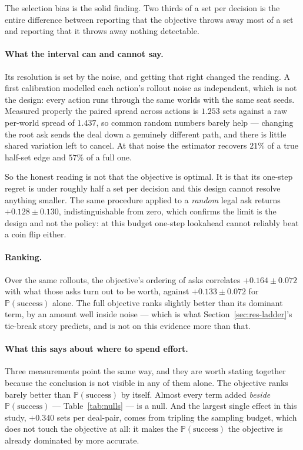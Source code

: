 \documentclass[11pt,a4paper]{article}
\newcommand{\Prob}{\ensuremath{\mathbb{P}}}
\begin{document}
The selection bias is the solid finding. Two thirds of a set per decision is the
entire difference between reporting that the objective throws away most of a set
and reporting that it throws away nothing detectable.

\paragraph{What the interval can and cannot say.} Its resolution is set by the
noise, and getting that right changed the reading. A first calibration modelled
each action's rollout noise as independent, which is not the design: every
action runs through the same worlds with the same seat seeds. Measured properly
the paired spread across actions is $1.253$ sets against a raw per-world spread
of $1.437$, so common random numbers barely help --- changing the root ask sends
the deal down a genuinely different path, and there is little shared variation
left to cancel. At that noise the estimator recovers $21\%$ of a true half-set
edge and $57\%$ of a full one.

So the honest reading is not that the objective is optimal. It is that its
one-step regret is under roughly half a set per decision and this design cannot
resolve anything smaller. The same procedure applied to a \emph{random} legal ask
returns $+0.128 \pm 0.130$, indistinguishable from zero, which confirms the limit
is the design and not the policy: at this budget one-step lookahead cannot
reliably beat a coin flip either.

\paragraph{Ranking.} Over the same rollouts, the objective's ordering of asks
correlates $+0.164 \pm 0.072$ with what those asks turn out to be worth, against
$+0.133 \pm 0.072$ for $\Prob(\text{success})$ alone. The full objective ranks
slightly better than its dominant term, by an amount well inside noise --- which
is what Section~\ref{sec:res-ladder}'s tie-break story predicts, and is not on
this evidence more than that.

\paragraph{What this says about where to spend effort.} Three measurements point
the same way, and they are worth stating together because the conclusion is not
visible in any of them alone. The objective ranks barely better than
$\Prob(\text{success})$ by itself. Almost every term added \emph{beside}
$\Prob(\text{success})$ --- Table~\ref{tab:nulls} --- is a null. And the largest
single effect in this study, $+0.340$ sets per deal-pair, comes from tripling the
sampling budget, which does not touch the objective at all: it makes the
$\Prob(\text{success})$ the objective is already dominated by more accurate.
\end{document}
